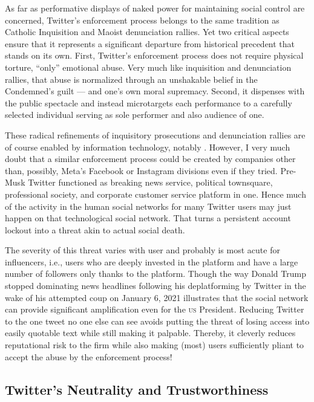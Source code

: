 As far as performative displays of naked power for maintaining social control
are concerned, Twitter's enforcement process belongs to the same tradition as
Catholic Inquisition and Maoist denunciation rallies. Yet two critical aspects
ensure that it represents a significant departure from historical precedent that
stands on its own. First, Twitter's enforcement process does not require
physical torture, ``only'' emotional abuse. Very much like inquisition and
denunciation rallies, that abuse is normalized through an unshakable belief in
the Condemned's guilt — and one's own moral supremacy. Second, it dispenses with
the public spectacle and instead microtargets each performance to a carefully
selected individual serving as sole performer and also audience of one.

These radical refinements of inquisitory prosecutions and denunciation rallies
are of course enabled by information technology, notably \AI. However, I very
much doubt that a similar enforcement process could be created by companies
other than, possibly, Meta's Facebook or Instagram divisions even if they tried.
Pre-Musk Twitter functioned as breaking news service, political townsquare,
professional society, and corporate customer service platform in one. Hence much
of the activity in the human social networks for many Twitter users may just
happen on that technological social network. That turns a persistent account
lockout into a threat akin to actual social death.

The severity of this threat varies with user and probably is most acute for
influencers, i.e., users who are deeply invested in the platform and have a
large number of followers only thanks to the platform. Though the way Donald
Trump stopped dominating news headlines following his deplatforming by Twitter
in the wake of his attempted coup on January 6, 2021 illustrates that the social
network can provide significant amplification even for the \textsc{us}
President. Reducing Twitter to the one tweet no one else can see avoids putting
the threat of losing access into easily quotable text while still making it
palpable. Thereby, it cleverly reduces reputational risk to the firm while also
making (most) users sufficiently pliant to accept the abuse by the enforcement
process!


\subsection{Twitter's Neutrality and Trustworthiness}

